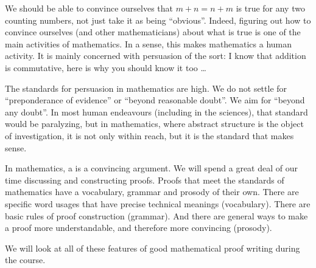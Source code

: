 We should be able to convince ourselves that $m+n = n+m$ is true for any two counting numbers, not just take it as being ``obvious''. 
Indeed, figuring out how to convince ourselves (and other mathematicians) about what is true is one of the main activities of mathematics.
In a sense, this makes mathematics a human activity.
It is mainly concerned with persuasion of the sort: I know that addition is commutative, here is why you should know it too \ldots

The standards for persuasion in mathematics are high. 
We do not settle for ``preponderance of evidence'' or ``beyond reasonable doubt''.
We aim for ``beyond any doubt''. 
In most human endeavours (including in the sciences), that standard would be paralyzing, but in mathematics, where abstract structure is the object of investigation, it is not only within reach, but it is the standard that makes sense.

In mathematics, a  is a convincing argument.
We will spend a great deal of our time discussing and constructing proofs.
Proofs that meet the standards of mathematics have a vocabulary, grammar and prosody of their own.
There are specific word usages that have precise technical meanings (vocabulary).
There are basic rules of proof construction (grammar).
And there are general ways to make a proof more understandable, and therefore more convincing (prosody).

We will look at all of these features of good mathematical proof writing during the course.